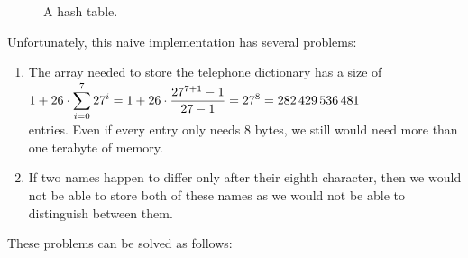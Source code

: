 \begin{figure}[!ht]
  \centering
  \caption{A hash table.}
  \label{fig:hash-example}
\end{figure}

\noindent
Unfortunately, this naive implementation has several problems: 
\begin{enumerate}
\item The array needed to store the telephone dictionary has a size of 
      \\[0.2cm]
      \hspace*{1.3cm}
      $\displaystyle 1 + 26 \cdot \sum\limits_{i=0}^7 27^i = 1 + 26 \cdot \frac{27^{7+1} - 1}{27 - 1} = 27^8 = 282\,429\,536\,481$ 
      \\[0.2cm]
      entries.  Even if every entry only needs 8 bytes, we still would need more than one terabyte
      of memory.
\item If two names happen to differ only after their eighth character, then we would not be able to
      store both of these names as we would not be able to distinguish between them.
\end{enumerate}
These problems can be solved as follows:
